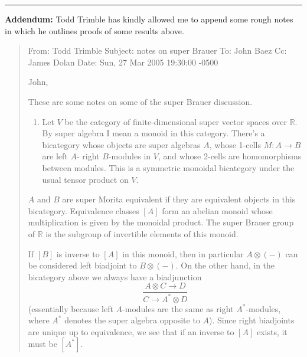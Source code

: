 \documentclass{article}
\def\tightlist{}
\renewcommand{\texttt}[1]{%
  \begingroup
  \ttfamily
  \begingroup\lccode`~=`/\lowercase{\endgroup\def~}{/\discretionary{}{}{}}%
  \begingroup\lccode`~=`[\lowercase{\endgroup\def~}{[\discretionary{}{}{}}%
  \begingroup\lccode`~=`.\lowercase{\endgroup\def~}{.\discretionary{}{}{}}%
  \catcode`/=\active\catcode`[=\active\catcode`.=\active
  \scantokens{#1\noexpand}%
  \endgroup
}
\begin{document}

\begin{center}\rule{0.5\linewidth}{0.5pt}\end{center}

\textbf{Addendum:} Todd Trimble has kindly allowed me to append some
rough notes in which he outlines proofs of some results above.

\begin{quote}
From: Todd Trimble Subject: notes on super Brauer To: John Baez Cc:
James Dolan Date: Sun, 27 Mar 2005 19:30:00 -0500

John,

These are some notes on some of the super Brauer discussion.

\begin{enumerate}
\def\labelenumi{\arabic{enumi}.}
\tightlist
\item
  Let \(V\) be the category of finite-dimensional super vector spaces
  over \(\mathbb{R}\). By super algebra I mean a monoid in this
  category. There's a bicategory whose objects are super algebras \(A\),
  whose 1-cells \(M\colon A \to B\) are left \(A\)- right \(B\)-modules
  in \(V\), and whose 2-cells are homomorphisms between modules. This is
  a symmetric monoidal bicategory under the usual tensor product on
  \(V\).
\end{enumerate}

\(A\) and \(B\) are super Morita equivalent if they are equivalent
objects in this bicategory. Equivalence classes \([A]\) form an abelian
monoid whose multiplication is given by the monoidal product. The super
Brauer group of \(\mathbb{R}\) is the subgroup of invertible elements of
this monoid.

If \([B]\) is inverse to \([A]\) in this monoid, then in particular
\(A \otimes (-)\) can be considered left biadjoint to \(B \otimes (-)\).
On the other hand, in the bicategory above we always have a biadjunction
\[\frac{A\otimes C\to D}{C\to A^*\otimes D}\] (essentially because left
\(A\)-modules are the same as right \(A^*\)-modules, where \(A^*\)
denotes the super algebra opposite to \(A\)). Since right biadjoints are
unique up to equivalence, we see that if an inverse to \([A]\) exists,
it must be \([A^*]\).


\end{quote}
\end{document}
